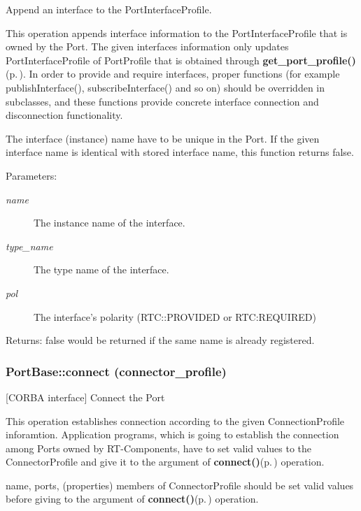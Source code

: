 Append an interface to the Port\-Interface\-Profile. 

This operation appends interface information to the Port\-Interface\-Profile that is owned by the Port. The given interfaces information only updates Port\-Interface\-Profile of Port\-Profile that is obtained through {\bf get\_\-port\_\-profile()}{\rm (p.\,\pageref{classPortBase_PortBasea2})}. In order to provide and require interfaces, proper functions (for example publish\-Interface(), subscribe\-Interface() and so on) should be overridden in subclasses, and these functions provide concrete interface connection and disconnection functionality.

The interface (instance) name have to be unique in the Port. If the given interface name is identical with stored interface name, this function returns false.

\begin{Desc}
\item[Parameters:]
\begin{description}
\item[{\em name}]The instance name of the interface. \item[{\em type\_\-name}]The type name of the interface. \item[{\em pol}]The interface's polarity (RTC::PROVIDED or RTC:REQUIRED) \end{description}
\end{Desc}
\begin{Desc}
\item[Returns:]false would be returned if the same name is already registered.\end{Desc}
\subsubsection{\setlength{\rightskip}{0pt plus 5cm}Port\-Base::connect (connector\_\-profile)}\label{classPortBase_PortBasea5}


[CORBA interface] Connect the Port 

This operation establishes connection according to the given Connection\-Profile inforamtion. Application programs, which is going to establish the connection among Ports owned by RT-Components, have to set valid values to the Connector\-Profile and give it to the argument of {\bf connect()}{\rm (p.\,\pageref{classPortBase_PortBasea5})} operation.

name, ports, (properties) members of Connector\-Profile should be set valid values before giving to the argument of {\bf connect()}{\rm (p.\,\pageref{classPortBase_PortBasea5})} operation.

